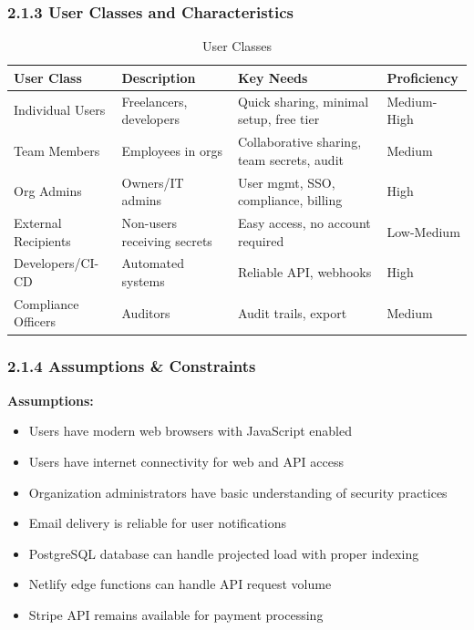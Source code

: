 \documentclass[12pt,a4paper]{article}
\begin{document}
\subsubsection*{2.1.3 User Classes and Characteristics}
\begin{table}[H]
  \centering
  \small
  \caption{User Classes}
  \begin{tabular}{@{}p{2.8cm}p{3cm}p{4cm}p{2.2cm}@{}}
    \toprule
    \textbf{User Class} & \textbf{Description}        & \textbf{Key Needs}                         & \textbf{Proficiency} \\
    \midrule
    Individual Users    & Freelancers, developers     & Quick sharing, minimal setup, free tier    & Medium-High          \\
    \hline
    Team Members        & Employees in orgs           & Collaborative sharing, team secrets, audit & Medium               \\
    \hline
    Org Admins          & Owners/IT admins            & User mgmt, SSO, compliance, billing        & High                 \\
    \hline
    External Recipients & Non-users receiving secrets & Easy access, no account required           & Low-Medium           \\
    \hline
    Developers/CI-CD    & Automated systems           & Reliable API, webhooks                     & High                 \\
    \hline
    Compliance Officers & Auditors                    & Audit trails, export                       & Medium               \\
    \bottomrule
  \end{tabular}
\end{table}

\subsubsection*{2.1.4 Assumptions \& Constraints}

\textbf{Assumptions:}
\begin{itemize}[leftmargin=*, itemsep=0.1em]
  \item Users have modern web browsers with JavaScript enabled
  \item Users have internet connectivity for web and API access
  \item Organization administrators have basic understanding of security practices
  \item Email delivery is reliable for user notifications
  \item PostgreSQL database can handle projected load with proper indexing
  \item Netlify edge functions can handle API request volume
  \item Stripe API remains available for payment processing
\end{itemize}
\end{document}
